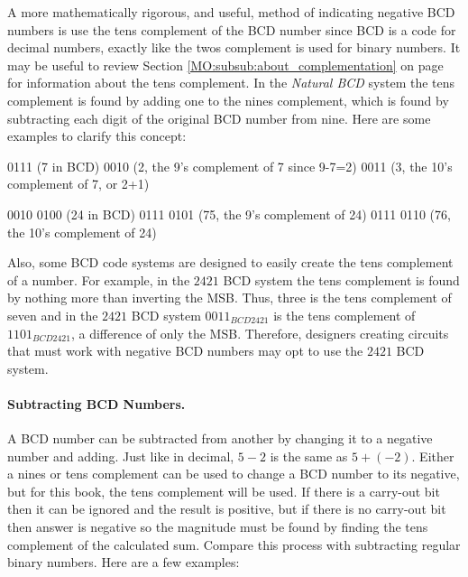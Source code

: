 A more mathematically rigorous, and useful, method of indicating negative \ac{BCD} numbers is use the tens complement of the \ac{BCD} number since \ac{BCD} is a code for decimal numbers, exactly like the twos complement is used for binary numbers. It may be useful to review Section \ref{MO:subsub:about_complementation} on page \pageref{MO:subsub:about_complementation} for information about the tens complement. In the \emph{Natural BCD} system the tens complement is found by adding one to the nines complement, which is found by subtracting each digit of the original \ac{BCD} number from nine. Here are some examples to clarify this concept:

\begin{binDisp}[commandchars=~\[\]]
    0111 (7 in BCD)
    0010 (2, the 9's complement of 7 since 9-7=2)
    0011 (3, the 10's complement of 7, or 2+1)
\end{binDisp}

\begin{binDisp}[commandchars=~\[\]]
    0010 0100 (24 in BCD)
    0111 0101 (75, the 9's complement of 24)
    0111 0110 (76, the 10's complement of 24)
\end{binDisp}

Also, some \ac{BCD} code systems are designed to easily create the tens complement of a number. For example, in the $ 2421 $ \ac{BCD} system the tens complement is found by nothing more than inverting the \ac{MSB}. Thus, three is the tens complement of seven and in the $ 2421 $ \ac{BCD} system $ 0011_{BCD2421} $ is the tens complement of $ 1101_{BCD2421} $, a difference of only the \ac{MSB}. Therefore, designers creating circuits that must work with negative \ac{BCD} numbers may opt to use the $ 2421 $ \ac{BCD} system.

\paragraph{Subtracting BCD Numbers.} A \ac{BCD} number can be subtracted from another by changing it to a negative number and adding. Just like in decimal, $ 5 - 2 $ is the same as $ 5 + (-2) $. Either a nines or tens complement can be used to change a \ac{BCD} number to its negative, but for this book, the tens complement will be used. If there is a carry-out bit then it can be ignored and the result is positive, but if there is no carry-out bit then answer is negative so the magnitude must be found by finding the tens complement of the calculated sum. Compare this process with subtracting regular binary numbers. Here are a few examples:

